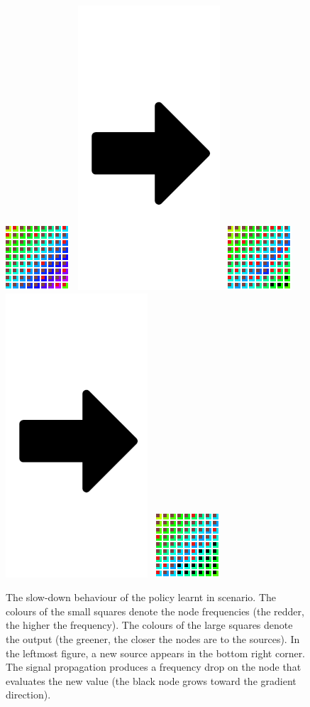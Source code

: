 \begin{figure}
    \centering
    \includegraphics[width=0.2\linewidth]{papers/acsos2022/img//start.png}
    \,
    \includegraphics[width=0.1\linewidth]{papers/acsos2022/img//arrow.png}
    \,
    \includegraphics[width=0.2\linewidth]{papers/acsos2022/img//middle.png}
    \,
    \includegraphics[width=0.1\linewidth]{papers/acsos2022/img//arrow.png}
    \,
    \includegraphics[width=0.2\linewidth]{papers/acsos2022/img//end.png}
    \caption[Scheduling dynamics after the learning phase]{The slow-down behaviour of the policy learnt in \swapscen{} scenario.
    The colours of the small squares denote the node frequencies 
    (the redder, the higher the frequency).
    The colours of the large squares denote the output 
    (the greener, the closer the nodes are to the sources).
    In the leftmost figure, a new source appears in the bottom right corner. 
    The signal propagation produces a frequency drop on the node that evaluates the new value 
    (the black node grows toward the gradient direction).
    }\label{acsos2022:fig:simulation-evolution}
\end{figure}

